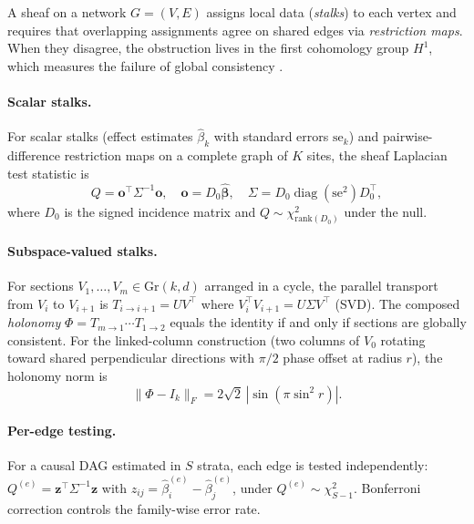 \documentclass{article}
\newcommand{\Gr}{\mathrm{Gr}}
\begin{document}
A sheaf on a network $G = (V, E)$ assigns local data (\emph{stalks}) to each vertex and requires that overlapping assignments agree on shared edges via \emph{restriction maps}.
When they disagree, the obstruction lives in the first cohomology group $H^1$, which measures the failure of global consistency \citep{curry2014sheaves, robinson2014topological}.

\paragraph{Scalar stalks.}
For scalar stalks (effect estimates $\hat\beta_k$ with standard errors $\mathrm{se}_k$) and pairwise-difference restriction maps on a complete graph of $K$ sites, the sheaf Laplacian test statistic is
\begin{equation}
    Q = \mathbf{o}^\top \Sigma^{-1} \mathbf{o}, \quad
    \mathbf{o} = D_0 \boldsymbol{\hat\beta}, \quad
    \Sigma = D_0 \operatorname{diag}(\mathrm{se}^2) D_0^\top,
    \label{eq:sheaf-Q}
\end{equation}
where $D_0$ is the signed incidence matrix and $Q \sim \chi^2_{\mathrm{rank}(D_0)}$ under the null.

\paragraph{Subspace-valued stalks.}
For sections $V_1, \ldots, V_m \in \Gr(k,d)$ arranged in a cycle, the parallel transport from $V_i$ to $V_{i+1}$ is $T_{i \to i+1} = U V^\top$ where $V_i^\top V_{i+1} = U \Sigma V^\top$ (SVD).
The composed \emph{holonomy} $\Phi = T_{m \to 1} \cdots T_{1 \to 2}$ equals the identity if and only if sections are globally consistent.
For the linked-column construction (two columns of $V_0$ rotating toward shared perpendicular directions with $\pi/2$ phase offset at radius $r$), the holonomy norm is
\begin{equation}\label{eq:berry}
    \|\Phi - I_k\|_F = 2\sqrt{2}\,|\sin(\pi \sin^2 r)|.
\end{equation}

\paragraph{Per-edge testing.}
For a causal DAG estimated in $S$ strata, each edge is tested independently:
$Q^{(e)} = \mathbf{z}^\top \Sigma^{-1} \mathbf{z}$ with $z_{ij} = \hat\beta_i^{(e)} - \hat\beta_j^{(e)}$, under $Q^{(e)} \sim \chi^2_{S-1}$.
Bonferroni correction controls the family-wise error rate.
\end{document}
